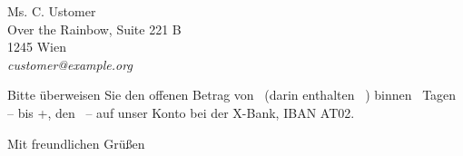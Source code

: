 \documentclass[fontsize=11pt,parskip=half]{scrlttr2}
\begin{document}
\begin{letter}{%
						Ms. C. Ustomer\\
						Over the Rainbow, Suite 221\kern 1pt B\\
						1245 Wien\\[1ex]
						\hfill\emph{customer@example.org}
	}


		Bitte überweisen Sie den offenen Betrag von 
		\Total\ (darin enthalten \TaxAmnt ~\TaxAbrv) 
		binnen \numberstringnum{\payperiod}~Tagen – bis \DayName{\year}{\month}%
		{\day+\payperiod}, den \duedate\ – 
		auf unser Konto bei der X-Bank, IBAN AT02.

		\AdvanceDate[-\payperiod]				%




		\closing{Mit freundlichen Grüßen}

	\end{letter}
\end{document}
